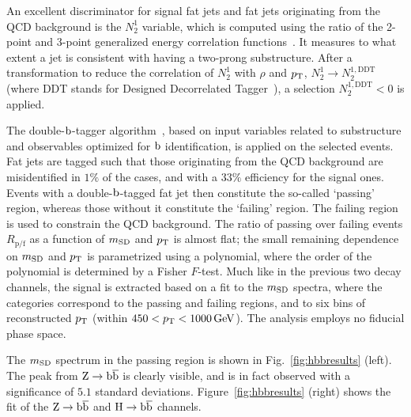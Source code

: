 An excellent discriminator for signal fat jets and fat jets originating from the QCD background is the $N^1_2$ variable, which is computed using the ratio of the 2-point and 3-point generalized energy correlation functions~\cite{Larkoski:2013eya}.
% 
It measures to what extent a jet is consistent with having a two-prong substructure.
% 
After a transformation to reduce the correlation of $N^1_2$ with $\rho$ and $p_\mathrm{T}$, $N^1_2 \to N_2^{1,\text{DDT}}$ (where DDT stands for Designed Decorrelated Tagger~\cite{Dolen:2016kst}), a selection $N_2^{1,\text{DDT}} < 0$ is applied.


The double-$\mathrm{b}$-tagger algorithm~\cite{Sirunyan:2017ezt}, based on input variables related to substructure and observables optimized for $\mathrm{b}$ identification, is applied on the selected events.
% 
Fat jets are tagged such that those originating from the QCD background are misidentified in $1\%$ of the cases, and with a $33\%$ efficiency for the signal ones.
% 
Events with a double-$\mathrm{b}$-tagged fat jet then constitute the so-called `passing' region, whereas those without it constitute the `failing' region.
% 
The failing region is used to constrain the QCD background.
% 
The ratio of passing over failing events $R_\text{p/f}$ as a function of $m_\mathrm{SD}$ and $p_\mathrm{T}$ is almost flat; the small remaining dependence on $m_\mathrm{SD}$ and $p_\mathrm{T}$ is parametrized using a polynomial, where the order of the polynomial is determined by a Fisher $F$-test.
% 
Much like in the previous two decay channels, the signal is extracted based on a fit to the $m_\mathrm{SD}$ spectra, where the categories correspond to the passing and failing regions, and to six bins of reconstructed $p_\mathrm{T}$ (within $450 < p_\mathrm{T} < 1000\,\text{GeV}$).
% 
The analysis employs no fiducial phase space.


The $m_\mathrm{SD}$ spectrum in the passing region is shown in Fig.~\ref{fig:hbbresults} (left).
% 
The peak from $\mathrm{Z}\to\mathrm{b}\overline{\mathrm{b}}$ is clearly visible, and is in fact observed with a significance of $5.1$ standard deviations.
% 
Figure~\ref{fig:hbbresults} (right) shows the fit of the $\mathrm{Z}\to\mathrm{b}\overline{\mathrm{b}}$ and $\mathrm{H}\to\mathrm{b}\overline{\mathrm{b}}$ channels.


